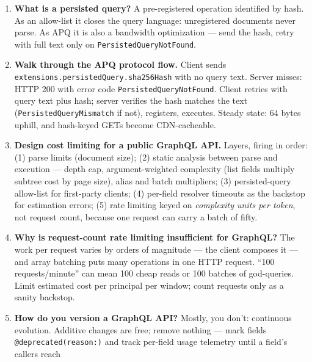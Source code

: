 \begin{enumerate}[label=\textbf{Q\arabic*.}, leftmargin=2.6em]
        It is the specification's only ordering guarantee, made precisely
        so multi-step writes have defined semantics: root mutation fields
        run in document order, each seeing the previous one's effects.
        Queries have no such guarantee and may resolve in parallel.
  \item \textbf{What is a persisted query?}
        A pre-registered operation identified by hash. As an allow-list
        it closes the query language: unregistered documents never parse.
        As APQ it is also a bandwidth optimization --- send the hash,
        retry with full text only on \texttt{PersistedQueryNotFound}.
  \item \textbf{Walk through the APQ protocol flow.}
        Client sends \texttt{extensions.persistedQuery.sha256Hash} with
        no query text. Server misses: HTTP 200 with error code
        \texttt{PersistedQueryNotFound}. Client retries with query text
        plus hash; server verifies the hash matches the text
        (\texttt{PersistedQueryMismatch} if not), registers, executes.
        Steady state: 64 bytes uphill, and hash-keyed GETs become
        CDN-cacheable.
  \item \textbf{Design cost limiting for a public GraphQL API.}
        Layers, firing in order: (1) parse limits (document size);
        (2) static analysis between parse and execution --- depth cap,
        argument-weighted complexity (list fields multiply subtree cost
        by page size), alias and batch multipliers; (3) persisted-query
        allow-list for first-party clients; (4) per-field resolver
        timeouts as the backstop for estimation errors; (5) rate limiting
        keyed on \emph{complexity units per token}, not request count,
        because one request can carry a batch of fifty.
  \item \textbf{Why is request-count rate limiting insufficient for
        GraphQL?}
        The work per request varies by orders of magnitude --- the client
        composes it --- and array batching puts many operations in one
        HTTP request. ``100 requests/minute'' can mean 100 cheap reads or
        100 batches of god-queries. Limit estimated cost per principal
        per window; count requests only as a sanity backstop.
  \item \textbf{How do you version a GraphQL API?}
        Mostly, you don't: continuous evolution. Additive changes are
        free; remove nothing --- mark fields \texttt{@deprecated(reason:)}
        and track per-field usage telemetry until a field's callers reach

\end{enumerate}
